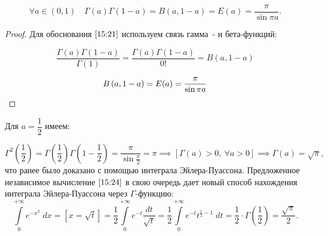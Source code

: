 \documentclass[../../main.tex]{subfiles}
\begin{document}
	
\begin{corollary*}
	\begin{equation}
	\label{15:21}
	\forall a \in (0,1) \quad \Gamma(a)\Gamma \left( 1-a\right)  = B\left( 
	a,1-a\right) = E(a) = \frac{\pi}{\sin{\pi a}}.
	\end{equation}
\end{corollary*}


\begin{proof}
	Для обоснования $\eqref{15:21}$ используем связь гамма~- и бета-функций:
	
	\begin{equation}
	\label{15:22}
	\frac{\Gamma \left( a\right)\Gamma \left( 1-a\right)}{\Gamma \left( 1\right)} 
	= \frac{\Gamma \left( a\right)\Gamma \left( 1-a\right)}{0!} = B \left( 
	a,1-a\right)
	\end{equation}
	
	\begin{equation}
	\label{15:23}
	B \left( a,1-a\right) = E(a) = \frac{\pi}{\sin{\pi a}}
	\qedhere
	\end{equation}
\end{proof}	

Для $a = \dfrac{1}{2}$ имеем:

\begin{equation}
\label{15:24}
\Gamma^2 \left( \frac{1}{2} \right) = \Gamma \left( \frac{1}{2} \right) \Gamma 
\left( 1-\frac{1}{2} \right) = \frac{\pi}{\sin{\frac{\pi}{2}}} = \pi \implies 
\left[ \Gamma(a) > 0,\ \forall a > 0\right] \implies \Gamma(a) = \sqrt{\pi},
\end{equation}
что ранее было доказано с помощью интеграла Эйлера-Пуассона. Предложенное 
независимое вычисление $\eqref{15:24}$ в свою очередь дает новый способ 
нахождения интеграла Эйлера-Пуассона через $\Gamma$-функцию:
\[  \int\limits_{0}^{+\infty} e^{-x^2} \; dx = \left[ x = \sqrt{t} \right] =  
\frac{1}{2} \int\limits_{0}^{+\infty} e^{-t} \frac{dt}{\sqrt{t}} = \frac{1}{2} 
\int\limits_{0}^{+\infty} e^{-t} t^{\frac{1}{2} - 1} \; dt = \frac{1}{2} \cdot 
\Gamma\left( \frac{1}{2} \right) = \frac{\sqrt{\pi}}{2}. \]
\end{document}
